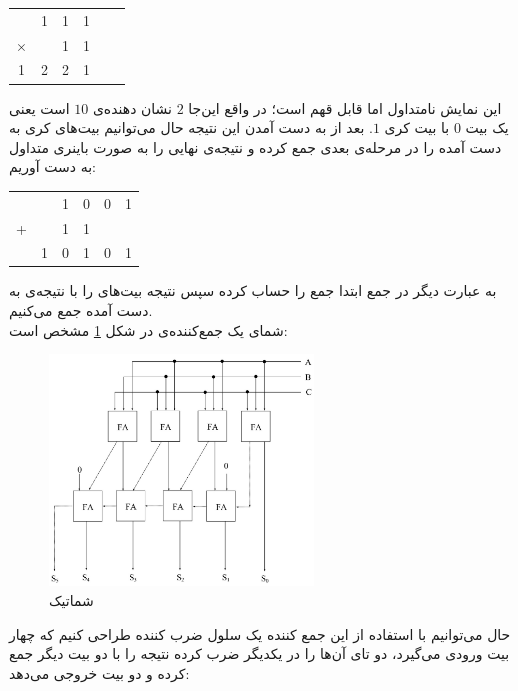 \documentclass{article}
\begin{document}
\begin{center}
\begin{latin}
\begin{tabular}{c@{\,}c@{\,}c@{\,}c@{\,}c@{\,}c}
 & 1 & 1 & 1 \\
$\times$ &   & 1 & 1 \\
\hline
   1 & 2 & 2 & 1 \\
\end{tabular}
\end{latin}
\end{center}
این نمایش نامتداول اما قابل قهم است؛ در واقع این‌جا $2$ نشان دهنده‌ی $10$ است یعنی یک بیت $0$ با بیت کری $1$. بعد از به دست آمدن این نتیجه حال می‌توانیم بیت‌های کری به دست آمده را در مرحله‌ی بعدی جمع کرده و نتیجه‌ی نهایی را به صورت باینری متداول به دست آوریم:
\begin{center}
\begin{latin}
\begin{tabular}{c@{\,}c@{\,}c@{\,}c@{\,}c@{\,}c}
&& 1 & 0 & 0 & 1 \\
+ &&1 &  1 &  &  \\
\hline
  & 1 & 0 & 1 & 0 & 1 \\
\end{tabular}
\end{latin}
\end{center}
\noindent
به عبارت دیگر در جمع  ابتدا جمع را حساب کرده سپس نتیجه بیت‌های  را با نتیجه‌ی به دست آمده جمع می‌کنیم.\\
شمای یک جمع‌کننده‌ی  در شکل \ref{fig:carry-save-schem} مشخص است:
\begin{figure}[H]
\centering
\includegraphics[width=7cm]{carry-save-schem}
\caption{شماتیک }
\label{fig:carry-save-schem}
\end{figure}
\noindent
حال می‌توانیم با استفاده از این جمع کننده یک سلول ضرب کننده طراحی کنیم که چهار بیت ورودی می‌گیرد، دو تای آن‌ها را در یکدیگر ضرب کرده نتیجه را با دو بیت دیگر جمع کرده و دو بیت خروجی می‌دهد:
\end{document}
